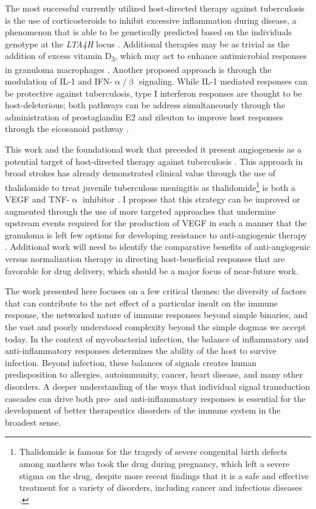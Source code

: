The most successful currently utilized host\hyp{}directed therapy against tuberculosis is the use of corticosteroids to inhibit excessive inflammation during disease, a phenomenon that is able to be genetically predicted based on the individuals genotype at the \textit{LTA4H} locus \citep{Tobin2012, Tobin2015}. Additional therapies may be as trivial as the addition of excess vitamin D\textsubscript{3}, which may act to enhance antimicrobial responses in granuloma macrophages \citep{Tobin2015}. Another proposed approach is through the modulation of IL\hyp{}1 and IFN\hyp{}$\upalpha$/$\upbeta$ signaling. While IL\hyp{}1 mediated responses can be protective against tuberculosis, type I interferon responses are thought to be host\hyp{}deleterious; both pathways can be address simultaneously through the administration of prostaglandin E2 and zileuton to improve host responses through the eicosanoid pathway \citep{MayerBarber2014, Kaufmann2014, Ji2021}.

This work and the foundational work that preceded it present angiogenesis as a potential target of host\hyp{}directed therapy against tuberculosis \citep{Oehlers2015, Datta2015, Oehlers2017, Polena2016, Walton2018}. This approach in broad strokes has already demonstrated clinical value through the use of thalidomide to treat juvenile tuberculous meningitis as thalidomide\footnote{Thalidomide is famous for the tragedy of severe congenital birth defects among mothers who took the drug during pregnancy, which left a severe stigma on the drug, despite more recent findings that it is a safe and effective treatment for a variety of disorders, including cancer and infectious diseases \citep{McBride1961, DAmato1994, Franks2004}.} is both a VEGF and TNF\hyp{}$\upalpha$ inhibitor \citep{Kaufmann2014, vanToorn2021}. I propose that this strategy can be improved or augmented through the use of more targeted approaches that undermine upstream events required for the production of VEGF in such a manner that the granuloma is left few options for developing resistance to anti\hyp{}angiogenic therapy \citep{Kiran2016}. Additional work will need to identify the comparative benefits of anti\hyp{}angiogenic versus normalization therapy in directing host\hyp{}beneficial responses that are favorable for drug delivery, which should be a major focus of near\hyp{}future work.

The work presented here focuses on a few critical themes: the diversity of factors that can contribute to the net effect of a particular insult on the immune response, the networked nature of immune responses beyond simple binaries, and the vast and poorly understood complexity beyond the simple dogmas we accept today. In the context of mycobacterial infection, the balance of inflammatory and anti\hyp{}inflammatory responses determines the ability of the host to survive infection. Beyond infection, these balances of signals creates human predisposition to allergies, autoimmunity, cancer, heart disease, and many other disorders. A deeper understanding of the ways that individual signal transduction cascades can drive both pro\hyp{} and anti\hyp{}inflammatory responses is essential for the development of better therapeutics disorders of the immune system in the broadest sense.

